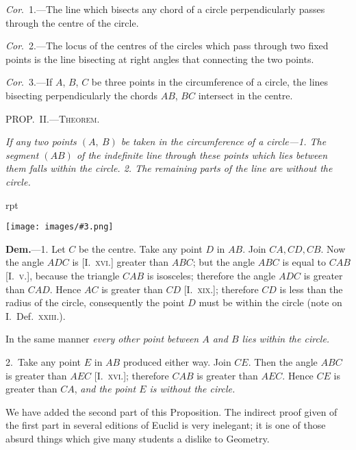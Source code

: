 \documentclass[oneside]{book}
\newcounter{wrapwidth}
\newcommand\mypropl[2]{
\bigskip\Needspace*{4\baselineskip}\begin{center}\textsc{#1}\end{center}
\hspace{\parindent}\emph{#2}\par\medskip
}
\newcommand\imgflow[3]{
\setcounter{wrapwidth}{#1}
\begin{wrapfigure}[#2]{r}{\value{wrapwidth}pt}
\begin{center}
\vspace{-0.3in}
\texttt{[image: images/\#3.png]}
\end{center}
\end{wrapfigure}
}
\begin{document}
\textit{Cor}.~1.---The line which bisects any chord of a circle
perpendicularly passes through the centre of the circle.

\textit{Cor}.~2.---The locus of the centres of the circles which
pass through two fixed points is the line bisecting at
right angles that connecting the two points.

\textit{Cor}.~3.---If $A$, $B$, $C$ be three points in the circumference
of a circle, the lines bisecting perpendicularly
the chords $AB$, $BC$ intersect in the centre.



\mypropl{PROP\@.~II\@.---Theorem.}{If any two points $(A,\ B)$ be taken in the circumference
of a circle---\textrm{1.} The segment $(AB)$ of the indefinite line
through these points which lies between them falls within
the circle. \textrm{2.} The remaining\label{remainiug} %
parts of the line are without
the circle.}

\imgflow{140}{9}{f105}

\textbf{Dem.}---1. Let $C$ be the centre. Take any point $D$
in $AB$. Join $CA, CD, CB$.
Now the angle $ADC$ is
[I.\ \textsc{xvi.}] greater than $ABC$;
but the angle $ABC$ is equal
to $CAB$ [I.\ \textsc{v.}], because the
triangle $CAB$ is isosceles;
therefore the angle $ADC$ is
greater than $CAD$. Hence
$AC$ is greater than $CD$ [I.\ \textsc{xix.}]; therefore $CD$ is less
than the radius of the circle, consequently the point $D$
must be within the circle (note on I.\ Def.\ \textsc{xxiii.}).

In the same manner \textit{every other point between $A$ and
$B$ lies within the circle.}\par\medskip

2.~Take any point $E$ in $AB$ produced either way.
Join $CE$. Then the angle $ABC$ is greater than $AEC$
[I.\ \textsc{xvi.}]; therefore $CAB$ is greater than $AEC$. Hence
$CE$ is greater than $CA$, \textit{and the point $E$ is without the
circle.}\par\medskip

\begin{footnotesize}
We have added the second part of this Proposition. The indirect
proof given of the first part in several editions of Euclid
is very inelegant; it is one of those absurd things which give
many students a dislike to Geometry.
\par\end{footnotesize}\medskip
\end{document}
